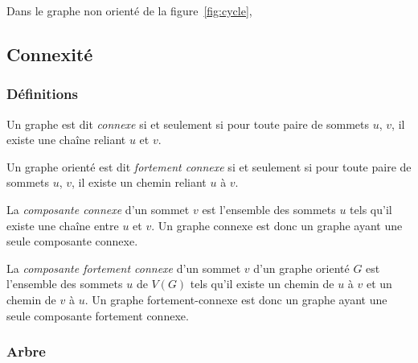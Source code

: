 \documentclass[11pt,a4paper]{report}
\begin{document}

Dans le graphe non orienté de la figure~\ref{fig:cycle}, 

\subsection{Connexité}

\subsubsection{Définitions}

Un graphe est dit {\em connexe} si et seulement si pour toute paire de sommets $u$, $v$, il existe une chaîne reliant $u$ et $v$.

Un graphe orienté est dit  {\em fortement connexe} si et seulement si pour toute paire de sommets $u$, $v$, il existe un chemin reliant $u$ à $v$.

La {\em composante connexe} d'un sommet $v$ est l'ensemble des sommets $u$ tels qu'il existe une chaîne entre $u$ et $v$. Un graphe connexe est donc un graphe ayant une seule composante connexe.

La {\em composante fortement connexe} d'un sommet $v$ d'un graphe orienté $G$ est l'ensemble des sommets $u$ de $V(G)$ tels qu'il existe un chemin de $u$ à $v$ et un chemin de $v$ à $u$. Un graphe fortement-connexe est donc un graphe ayant une seule composante fortement connexe.


\subsubsection{Arbre}
\end{document}
